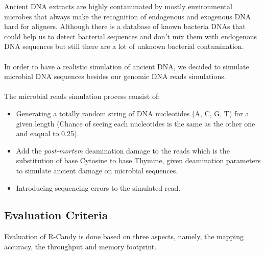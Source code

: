 \documentclass[11pt,a4paper]{report}
\begin{document}
Ancient DNA extracts are highly contaminated by mostly environmental microbes 
that always make the recognition of endogenous and exogenous DNA hard for aligners.
Although there is a database of known bacteria DNAs that could help us to detect 
bacterial sequences and don't mix them with endogenous DNA sequences but still 
there are a lot of unknown bacterial contamination.
\\\\
In order to have a realistic simulation of ancient DNA, we decided to simulate 
microbial DNA sequences besides our genomic DNA reads simulations.
\\\\
The microbial reads simulation process consist of:

\begin{itemize}

 \item Generating a totally random string of DNA nucleotides (A, C, G, T) for a 
given length (Chance of seeing each nucleotides is the same as the other one and 
eaqual to 0.25).

 \item Add the \emph{post-mortem} deamination damage to the reads which is the 
substitution of base Cytosine to base Thymine, given deamination parameters 
to simulate ancient damage on microbial sequences.


 \item Introducing sequencing errors to the simulated read.

\end{itemize}




\subsection{Evaluation Criteria} \label{Evaluation Criteria}

Evaluation of R-Candy is done based on three aspects, namely, 
the mapping accuracy, the throughput and memory footprint.
\end{document}
